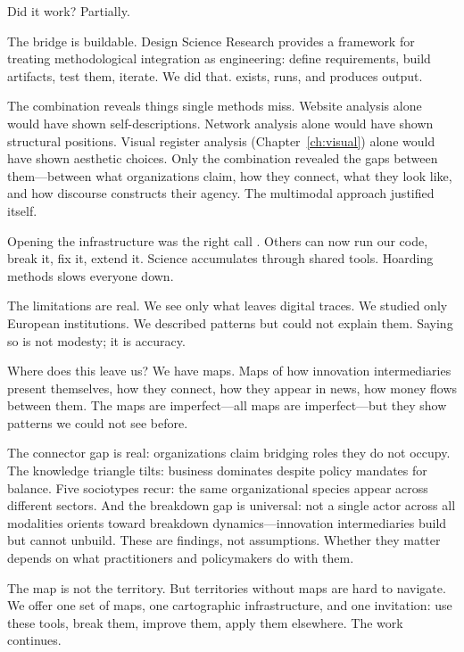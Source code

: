 \documentclass[../main.tex]{subfiles}
\begin{document}
Did it work? Partially.

The bridge is buildable. Design Science Research \cite{simon1996sciences,gregor2013positioning} provides a framework for treating methodological integration as engineering: define requirements, build artifacts, test them, iterate. We did that. \RoleBox{} exists, runs, and produces output.

The combination reveals things single methods miss. Website analysis alone would have shown self-descriptions. Network analysis alone would have shown structural positions. Visual register analysis (Chapter~\ref{ch:visual}) alone would have shown aesthetic choices. Only the combination revealed the gaps between them---between what organizations claim, how they connect, what they look like, and how discourse constructs their agency. The multimodal approach justified itself.

Opening the infrastructure was the right call \cite{salganik2019bitbybit}. Others can now run our code, break it, fix it, extend it. Science accumulates through shared tools. Hoarding methods slows everyone down.

The limitations are real. We see only what leaves digital traces. We studied only European institutions. We described patterns but could not explain them. Saying so is not modesty; it is accuracy.

Where does this leave us? We have maps. Maps of how innovation intermediaries present themselves, how they connect, how they appear in news, how money flows between them. The maps are imperfect---all maps are imperfect---but they show patterns we could not see before.

The connector gap is real: organizations claim bridging roles they do not occupy. The knowledge triangle tilts: business dominates despite policy mandates for balance. Five sociotypes recur: the same organizational species appear across different sectors. And the breakdown gap is universal: not a single actor across all modalities orients toward breakdown dynamics---innovation intermediaries build but cannot unbuild. These are findings, not assumptions. Whether they matter depends on what practitioners and policymakers do with them.

The map is not the territory. But territories without maps are hard to navigate. We offer one set of maps, one cartographic infrastructure, and one invitation: use these tools, break them, improve them, apply them elsewhere. The work continues.
\end{document}
